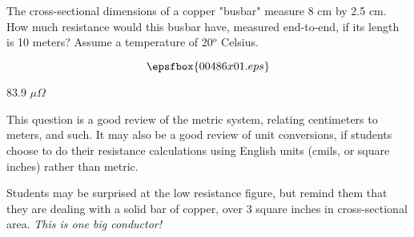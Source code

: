 

The cross-sectional dimensions of a copper "busbar" measure 8 cm by 2.5 cm.  How much resistance would this busbar have, measured end-to-end, if its length is 10 meters?  Assume a temperature of 20$^{o}$ Celsius.

$$\epsfbox{00486x01.eps}$$







83.9 $\mu \Omega$







This question is a good review of the metric system, relating centimeters to meters, and such.  It may also be a good review of unit conversions, if students choose to do their resistance calculations using English units (cmils, or square inches) rather than metric.

Students may be surprised at the low resistance figure, but remind them that they are dealing with a solid bar of copper, over 3 square inches in cross-sectional area.  {\it This is one big conductor!}





